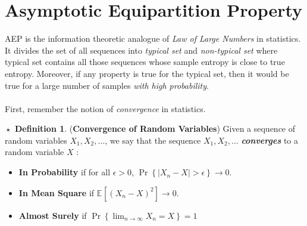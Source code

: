 \documentclass{article}
\theoremstyle{definition}
\newtheorem{definition}{$\boxed{\star}$ Definition}
\theoremstyle{remark}
\theoremstyle{definition}
\theoremstyle{definition}
\theoremstyle{definition}
\DeclarePairedDelimiter\abs{\lvert}{\rvert}
\newcommand{\expec}[2]{\mathbb{E}_{#1}\left[ #2\right]}
\renewcommand{\abs}[1]{\left \vert #1\right \vert}
\begin{document}
\section{Asymptotic Equipartition Property}
AEP is the information theoretic analogue of \emph{Law of Large Numbers} in statistics.	It divides the set of all sequences into \emph{typical set} and \emph{non-typical set} where typical set contains all those sequences whose sample entropy is close to true entropy. Moreover, if any property is true for the typical set, then it would be true for a large number of samples \emph{with high probability}.\\\\
First, remember the notion of \emph{convergence} in statistics.

\hrulefill
\begin{definition}
	(\textbf{Convergence of Random Variables}) Given a sequence of random variables $ X_1, X_2,\dots $, we say that the sequence $ X_1,X_2,\dots $ \textbf{\emph{converges}} to a random variable $ X $ :
	\begin{itemize}
		\item{\textbf{In Probability} if for all $ \epsilon >0 $, $ \Pr\left \{ \abs{X_n - X} > \epsilon\right \} \longrightarrow 0  $.}
		\item{\textbf{In Mean Square} if $ \expec{}{(X_n - X)^2} \longrightarrow 0$.}
		\item{\textbf{Almost Surely} if $ \Pr\left \{ \lim_{n\to \infty} X_n = X \right \} = 1 $}
	\end{itemize}
\end{definition}
\hrulefill
\end{document}
